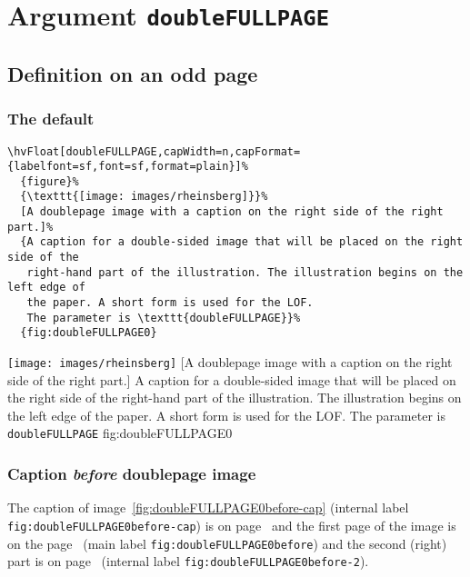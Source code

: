 \documentclass[twoside]{scrartcl}
\makeatletter
\let\hvBlindtext\Blindtext
\def\Blindtext{\par\color{black!40}\hvBlindtext\par\normalcolor}
\def\hvblindtext{\textcolor{black!40}{\blindtext@text}}
\makeatother
\begin{document}
\Blindtext
\Blindtext
\Blindtext

\Blindtext




\clearpage

\section{Argument \texttt{doubleFULLPAGE}}
\subsection{Definition on an odd page}

\hvblindtext

\subsubsection{The default}

\begin{lstlisting}
\hvFloat[doubleFULLPAGE,capWidth=n,capFormat={labelfont=sf,font=sf,format=plain}]%
  {figure}%
  {\texttt{[image: images/rheinsberg]}}%
  [A doublepage image with a caption on the right side of the right part.]%
  {A caption for a double-sided image that will be placed on the right side of the
   right-hand part of the illustration. The illustration begins on the left edge of 
   the paper. A short form is used for the LOF. 
   The parameter is \texttt{doubleFULLPAGE}}%
  {fig:doubleFULLPAGE0}
\end{lstlisting}


%
  {\texttt{[image: images/rheinsberg]}}%
  [A doublepage image with a caption on the right side of the right part.]%
  {A caption for a double-sided image that will be placed on the right side of the
   right-hand part of the illustration. The illustration begins on the left edge of 
   the paper. A short form is used for the LOF. 
   The parameter is \texttt{doubleFULLPAGE}}%
  {fig:doubleFULLPAGE0}

\Blindtext

\Blindtext


\subsubsection{Caption \emph{before} doublepage image}
The caption of image~\ref{fig:doubleFULLPAGE0before-cap} (internal label \texttt{fig:doubleFULLPAGE0before-cap}) is on 
page~\pageref{fig:doubleFULLPAGE0before-cap} and the first page of the image 
is on the page~\pageref{fig:doubleFULLPAGE0before} (main label \texttt{fig:doubleFULLPAGE0before}) and the
second (right) part  is on page~\pageref{fig:doubleFULLPAGE0before-2} (internal label \texttt{fig:doubleFULLPAGE0before-2}).
\end{document}
